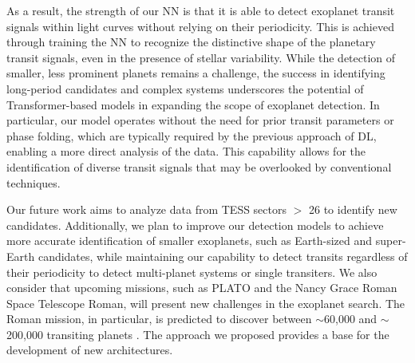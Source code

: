 
As a result, the strength of our NN is that it is able to detect exoplanet transit signals within light curves without relying on their periodicity. This is achieved through training the NN to recognize the distinctive shape of the planetary transit signals, even in the presence of stellar variability. While the detection of smaller, less prominent planets remains a challenge, the success in identifying long-period candidates and complex systems underscores the potential of Transformer-based models in expanding the scope of exoplanet detection. In particular, our model operates without the need for prior transit parameters or phase folding, which are typically required by the previous approach of DL, enabling a more direct analysis of the data. This capability allows for the identification of diverse transit signals that may be overlooked by conventional techniques.  \par


Our future work aims to analyze data from TESS sectors $>$ 26 to identify new candidates. Additionally, we plan to improve our detection models to achieve more accurate identification of smaller exoplanets, such as Earth-sized and super-Earth candidates, while maintaining our capability to detect transits regardless of their periodicity to detect multi-planet systems or single transiters. We also consider that upcoming missions, such as PLATO \citep{rauer2016plato} and the Nancy Grace Roman Space Telescope Roman, will present new challenges in the exoplanet search. The Roman mission, in particular, is predicted to discover between $\sim$60,000 and $\sim$200,000 transiting planets \citep{wilson2023transiting}. The approach we proposed provides a base for the development of new architectures.